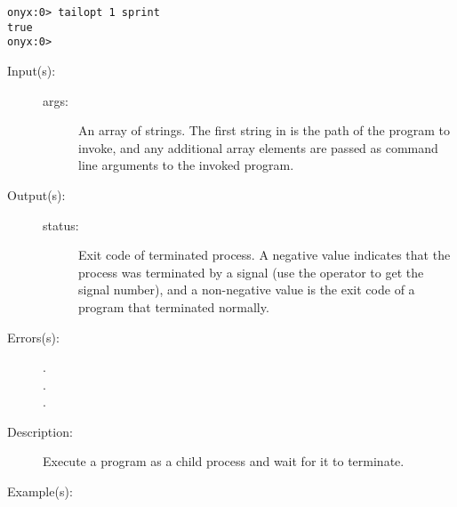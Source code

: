 \begin{description}
\begin{description}
\begin{verbatim}
onyx:0> tailopt 1 sprint
true
onyx:0>
		\end{verbatim}
	\end{description}
\label{systemdict:system}
\item[{\onyxop{args}{system}{status}}: ]
	\begin{description}\item[]
	\item[Input(s): ]
		\begin{description}\item[]
		\item[args: ]
			An array of strings.  The first string in 
			is the path of the program to invoke, and any additional
			array elements are passed as command line arguments to
			the invoked program.
		\end{description}
	\item[Output(s): ]
		\begin{description}\item[]
		\item[status: ]
			Exit code of terminated process.  A negative value
			indicates that the process was terminated by a signal
			(use the 
			operator to get the signal number), and a non-negative
			value is the exit code of a program that terminated
			normally.
		\end{description}
	\item[Errors(s): ]
		\begin{description}\item[]
		\item[.]
		\item[.]
		\item[.]
		\end{description}
	\item[Description: ]
		Execute a program as a child process and wait for it to
		terminate.
	\item[Example(s): ]\begin{verbatim}


\end{verbatim}
\end{description}
\end{description}
